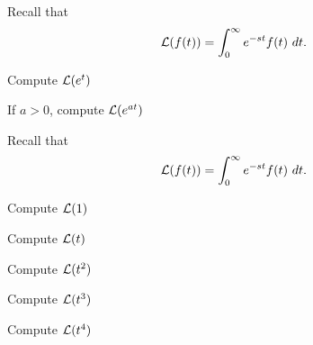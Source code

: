 \begin{applicationActivities}
\begin{activity}{5}
Recall that \[\mathcal{L}(f(t))=\int _0 ^\infty e^{-st} f(t)\ dt.\]
\begin{subactivity}
Compute \(\mathcal{L}(e^t)\)
\end{subactivity}
\begin{subactivity}
If \(a>0\), compute \(\mathcal{L}(e^{at})\)
\end{subactivity}
\end{activity}

\begin{activity}{15}
Recall that \[\mathcal{L}(f(t))=\int _0 ^\infty e^{-st} f(t)\ dt.\]
\begin{subactivity}
Compute \(\mathcal{L}(1)\)
\end{subactivity}
\begin{subactivity}
Compute \(\mathcal{L}(t)\)
\end{subactivity}
\begin{subactivity}
Compute \(\mathcal{L}(t^2)\)
\end{subactivity}
\begin{subactivity}
Compute \(\mathcal{L}(t^3)\)
\end{subactivity}
\begin{subactivity}
Compute \(\mathcal{L}(t^4)\)
\end{subactivity}
\end{activity}





\end{applicationActivities}
